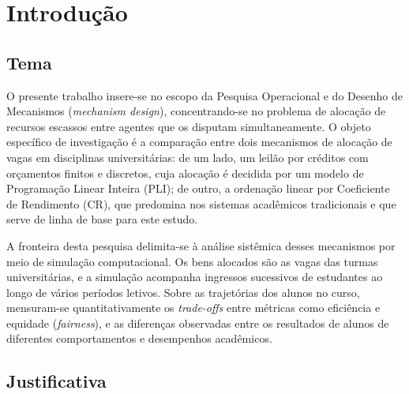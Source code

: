 \documentclass[
    12pt,
    openany,
    oneside,
    a4paper,
    english,
    brazil
]{abntex2}
\begin{document}
\pretextual

\imprimircapa
\imprimirfolhaderosto


\textual

\chapter{Introdução}
\label{cap:introducao}

\section{Tema}
\label{sec:tema}

O presente trabalho insere-se no escopo da Pesquisa Operacional e do Desenho de Mecanismos (\textit{mechanism design}), concentrando-se no problema de alocação de recursos escassos entre agentes que os disputam simultaneamente. O objeto específico de investigação é a comparação entre dois mecanismos de alocação de vagas em disciplinas universitárias: de um lado, um leilão por créditos com orçamentos finitos e discretos, cuja alocação é decidida por um modelo de Programação Linear Inteira (PLI); de outro, a ordenação linear por Coeficiente de Rendimento (CR), que predomina nos sistemas acadêmicos tradicionais \cite{sonmez2011} e que serve de linha de base para este estudo.

A fronteira desta pesquisa delimita-se à análise sistêmica desses mecanismos por meio de simulação computacional. Os bens alocados são as vagas das turmas universitárias, e a simulação acompanha ingressos sucessivos de estudantes ao longo de vários períodos letivos. Sobre as trajetórias dos alunos no curso, mensuram-se quantitativamente os \textit{trade-offs} entre métricas como eficiência e equidade (\textit{fairness}), e as diferenças observadas entre os resultados de alunos de diferentes comportamentos e desempenhos acadêmicos.

\section{Justificativa}
\label{sec:justificativa}
\end{document}
